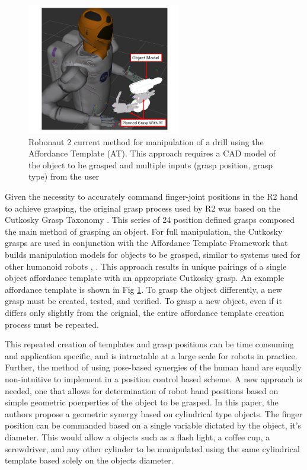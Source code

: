 \documentclass[runningheads,a4paper]{llncs}
\begin{document}
   \begin{figure}[!b]
      \centering
      \includegraphics[width=0.6\textwidth]{drill_at2}
      \caption{Robonaut 2 current method for manipulation of a drill using the Affordance Template (AT).  This approach requires a CAD model of the object to be grasped and multiple inputs (grasp position, grasp type) from the user}
      \label{at_example}
   \end{figure}

Given the necessity to accurately command finger-joint positions in the R2 hand to achieve grasping, the original grasp process used by R2 was based on the Cutkosky Grasp Taxonomy \cite{Cutkosky}. This series of 24 position defined grasps composed the main method of grasping an object. For full manipulation, the Cutkosky grasps are used in conjunction with the Affordance Template Framework \cite{affordance_templates} that builds manipulation models for objects to be grasped, similar to systems used for other humanoid robots \cite{DRC_Yanco}, \cite{IHMC}. 
This approach results in unique pairings of a single object affordance template with an appropriate Cutkosky grasp. An example affordance template is shown in Fig \ref{at_example}. To grasp the object differently, a new grasp must be created, tested, and verified. To grasp a new object, even if it differs only slightly from the orignial, the entire affordance template creation process must be repeated. 

This repeated creation of templates and grasp positions can be time consuming and application specific, and is intractable at a large scale for robots in practice. Further, the method of using pose-based synergies of the human hand are equally non-intuitive to implement in a position control based scheme. A new approach is needed, one that allows for determination of robot hand positions based on simple geometric poerperties of the object to be grasped. In this paper, the authors propose a geometric synergy based on cylindrical type objects. The finger position can be commanded based on a single variable dictated by the object, it's diameter. This would allow a objects such as a flash light, a coffee cup, a screwdriver, and any other cylinder to be manipulated using the same cylindrical template based solely on the objects diameter. 
\end{document}
